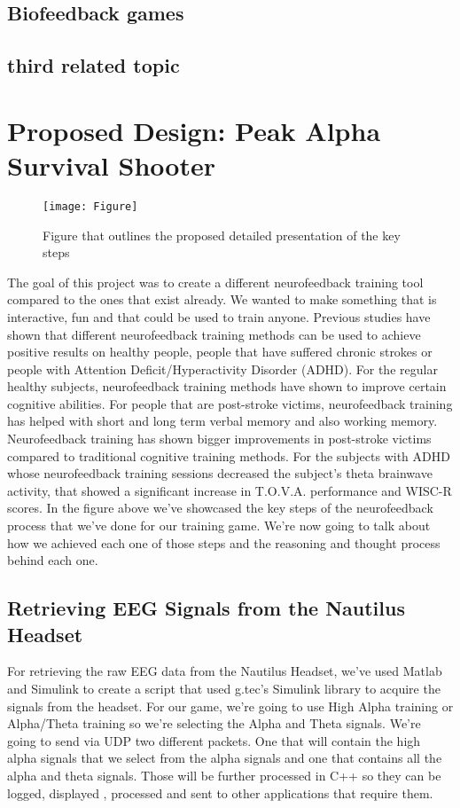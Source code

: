\documentclass[runningheads]{llncs}
\begin{document}
\subsection{ Biofeedback games}
\subsection{ third related topic}

\section{Proposed Design: Peak Alpha Survival Shooter}

\begin{figure}[htbp!]
  \caption{Figure that outlines the proposed detailed presentation of the key steps}
  \texttt{[image: Figure]}
\end{figure}

The goal of this project was to create a different neurofeedback training tool compared to the ones that exist already. We wanted to make something that is interactive, fun and that could be used to train anyone. Previous studies have shown that different neurofeedback training methods can be used to achieve positive results on healthy people, people that have suffered chronic strokes or people with Attention Deficit/Hyperactivity Disorder (ADHD). For the regular healthy subjects, neurofeedback training methods have shown to improve certain cognitive abilities. For people that are post-stroke victims, neurofeedback training has helped with short and long term verbal memory and also working memory. Neurofeedback training has shown bigger improvements in post-stroke victims compared to traditional cognitive training methods. For the subjects with ADHD whose neurofeedback training sessions decreased the subject's theta brainwave activity, that showed a significant increase in T.O.V.A. performance and WISC-R scores.
In the figure above we've showcased the key steps of the neurofeedback process that we've done for our training game. We're now going to talk about how we achieved each one of those steps and the reasoning and thought process behind each one.
\subsection{ Retrieving EEG Signals from the Nautilus Headset}
For retrieving the raw EEG data from the Nautilus Headset, we've used Matlab and Simulink to create a script that used g.tec's Simulink library to acquire the signals from the headset. For our game, we're going to use High Alpha training or Alpha/Theta training so we're selecting the Alpha and Theta signals. We're going to send via UDP two different packets. One that will contain the high alpha signals that we select from the alpha signals and one that contains all the alpha and theta signals. Those will be further processed in C++ so they can be logged, displayed , processed and sent to other applications that require them.
\end{document}
